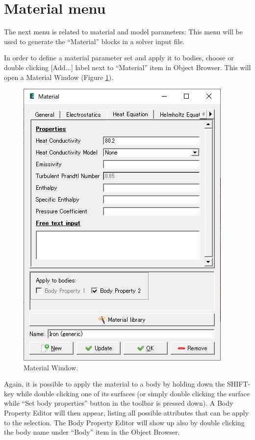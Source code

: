 \section{Material menu}

The next menu is related to material and model parameters:
This menu will be used to generate the ``Material'' blocks in a solver
input file.

\noindent In order to define a material parameter set and apply it to bodies, choose
\noindent or double clicking [Add...] label next to ``Material'' item in Object Browser. This will open a Material Window (Figure \ref{fig:material}).

\begin{figure}[htb]
\begin{center}
 \includegraphics[scale=0.5]{images/material.png}
\caption{Material Window.}
\label{fig:material}
\end{center}
\end{figure}

Again, it is possible to apply the material to a body by holding down the
SHIFT-key while double clicking one of its surfaces (or simply double clicking the surface while ``Set body properties'' button in the toolbar is pressed down).
A Body Property Editor will then appear,
listing all possible attributes that can be apply to the selection. The Body Property Editor will show up also by double clicking the body name under ``Body'' item in the Object Browser. 

